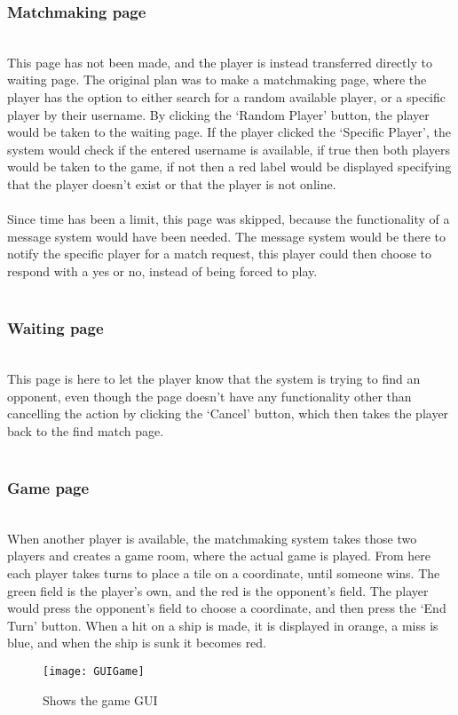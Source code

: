 \subsubsection{Matchmaking page}
\\
This page has not been made, and the player is instead transferred directly
 to waiting page. The original plan was to make a matchmaking page, where the
  player has the option to either search for a random available player, or a
	 specific player by their username. By clicking the ‘Random Player’ button,
	  the player would be taken to the waiting page. If the player clicked the
		‘Specific Player’, the system would check if the entered username is
		available, if true then both players would be taken to the game, if not
		 then a red label would be displayed specifying that the player doesn’t
		 exist or that the player is not online.
\\
\\
Since time has been a limit, this page was skipped, because the functionality
of a message system would have been needed. The message system would be there
 to notify the specific player for a match request, this player could then
 choose to respond with a yes or no, instead of being forced to play.
\\
\\
\subsubsection{Waiting page}
\\
This page is here to let the player know that the system is trying to find
an opponent, even though the page doesn’t have any functionality other than
 cancelling the action by clicking the ‘Cancel’ button, which then takes the
  player back to the find match page.
\\
\\
\subsubsection{Game page}
\\
When another player is available, the matchmaking system takes those two
 players and creates a game room, where the actual game is played. From here
  each player takes turns to place a tile on a coordinate, until someone wins.
	 The green field is the player's own, and the red is the opponent’s field.
	 The player would press the opponent's field to choose a coordinate, and then
	  press the ‘End Turn’ button. When a hit on a ship is made, it is displayed
		 in orange, a miss is blue, and when the ship is sunk it becomes red.
\begin{figure}[h]
	\centerline{\texttt{[image: GUIGame]}}
	\caption{Shows the game GUI}
\end{figure}
\\

